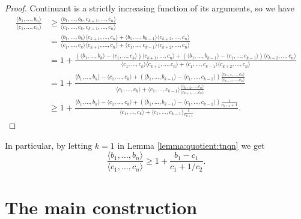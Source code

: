 \documentclass{amsart}
\theoremstyle{definition}
\newcommand{\0}{\mbf 0}%
\begin{document}
\begin{proof}
Continuant is a strictly increasing function of its arguments, so we have
\begin{align}
\frac{\langle b_1,\ldots,b_n\rangle}{\langle c_1,\ldots,c_n\rangle} &\geq \frac{\langle b_1,\ldots,b_k,c_{k+1},\ldots,c_n\rangle}{\langle c_1,\ldots,c_k,c_{k+1},\ldots,c_n\rangle} \\
&= \frac{\langle b_1,\ldots, b_k\rangle \langle c_{k+1},\ldots,c_n\rangle + \langle b_1,\ldots, b_{k-1}\rangle \langle c_{k+2},\ldots,c_n\rangle }{\langle c_1,\ldots, c_k\rangle \langle c_{k+1},\ldots,c_n\rangle + \langle c_1,\ldots, c_{k-1}\rangle \langle c_{k+2},\ldots,c_n\rangle} \\
& =1 + \frac{(\langle b_1,\ldots, b_k\rangle - \langle c_1,\ldots, c_k\rangle) \langle c_{k+1},\ldots,c_n\rangle + (\langle b_1,\ldots, b_{k-1}\rangle-\langle c_1,\ldots, c_{k-1}\rangle) \langle c_{k+2},\ldots,c_n\rangle }{\langle c_1,\ldots, c_k\rangle \langle c_{k+1},\ldots,c_n\rangle + \langle c_1,\ldots, c_{k-1}\rangle \langle c_{k+2},\ldots,c_n\rangle} \\
& = 1 + \frac{\langle b_1,\ldots, b_k\rangle - \langle c_1,\ldots, c_k\rangle  + (\langle b_1,\ldots, b_{k-1}\rangle-\langle c_1,\ldots, c_{k-1}\rangle) \frac{\langle c_{k+2},\ldots,c_n\rangle}{\langle c_{k+1},\ldots,c_n\rangle} }{\langle c_1,\ldots, c_k\rangle  + \langle c_1,\ldots, c_{k-1}\rangle \frac{ \langle c_{k+2},\ldots,c_n\rangle}{\langle c_{k+1},\ldots,c_n\rangle}}  \\
& \geq 1 + \frac{\langle b_1,\ldots, b_k\rangle - \langle c_1,\ldots,c_k\rangle + (\langle b_1,\ldots, b_{k-1}\rangle - \langle c_1,\ldots,c_{k-1}\rangle ) \frac{1}{c_{k+1}+1}}{\langle c_1,\ldots,c_k\rangle +\langle c_1,\ldots,c_{k-1} \rangle \frac{1}{c_{k+1}}} .
\end{align}
\end{proof}

In particular, by letting $k=1$ in Lemma \ref{lemma:quotient:tnqn} we get
$$
\frac{\langle b_1,\ldots,b_n\rangle}{\langle c_1,\ldots,c_n\rangle} \geq 1 + \frac{b_1-c_1}{c_1+1/c_2}.
$$



\section{The main construction}\label{sec:main:construction}
\end{document}
